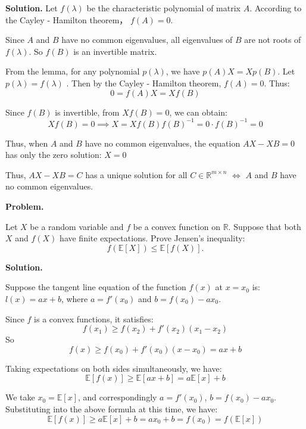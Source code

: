 \documentclass[12pt, a4paper, oneside]{ctexart}
\newcounter{problemname}
\newenvironment{problem}{\begin{shaded}\stepcounter{problemname}\par\noindent\textbf{Problem\arabic{problemname}. }}{\end{shaded}\par}
\newenvironment{solution}{\par\noindent\textbf{Solution. }}{\par}
\begin{document}
\begin{solution}
Let $ f(\lambda) $ be the characteristic polynomial of matrix $ A $. According to the Cayley - Hamilton theorem， $ f(A)=0 $.  

Since $ A $ and $ B $ have no common eigenvalues, all eigenvalues of $ B $ are not roots of $ f(\lambda) $. So $ f(B) $ is an invertible matrix.  

From the lemma, for any polynomial $ p(\lambda) $, we have $ p(A) X = X p(B) $. Let $ p(\lambda)=f(\lambda) $ . Then by the Cayley - Hamilton theorem, $ f(A)=0 $. Thus:  
$$
0 = f(A) X = X f(B)
$$  

Since $ f(B) $ is invertible, from $ X f(B)=0 $, we can obtain:  
$$
X f(B)=0 \implies X = X f(B) f(B)^{-1}=0 \cdot f(B)^{-1}=0
$$  

Thus, when $ A $ and $ B $ have no common eigenvalues, the equation $ A X - X B = 0 $ has only the zero solution:  $X = 0$

Thus, $ AX - XB = C $ has a unique solution for all $ C \in \mathbb{R}^{m \times n} $ $ \Leftrightarrow $ $ A $ and $ B $ have no common eigenvalues.

\end{solution}


\begin{problem}

\noindent Let $ X $ be a random variable and $ f $ be a convex function on $ \mathbb{R} $. Suppose that both $ X $ and $ f(X) $ have finite expectations. Prove Jensen's inequality:
$$
f(\mathbb{E}[X]) \leq \mathbb{E}[f(X)].
$$

\end{problem}

\begin{solution}


Suppose the tangent line equation of the function $ f(x) $ at $ x = x_0 $ is:$l(x)=ax + b$, where $ a = f'(x_0) $ and $ b = f(x_0)-ax_0 $.

Since $f$ is a convex functions, it satisfies:
$$
f(x_1)\geq f(x_2)+f'(x_2)(x_1 - x_2)
$$
So
$$
f(x)\geq f(x_0)+f'(x_0)(x - x_0)=ax + b
$$

Taking expectations on both sides simultaneously, we have:
$$
\mathbb{E}[f(x)]\geq \mathbb{E}[ax + b]=a\mathbb{E}[x]+b
$$

We take $ x_0 = \mathbb{E}[x] $, and correspondingly $ a = f'(x_0) $, $ b = f(x_0)-ax_0 $. Substituting into the above formula at this time, we have:
$$
\mathbb{E}[f(x)]\geq a\mathbb{E}[x]+b = ax_0 + b = f(x_0)=f(\mathbb{E}[x])
$$

\end{solution}
\end{document}
